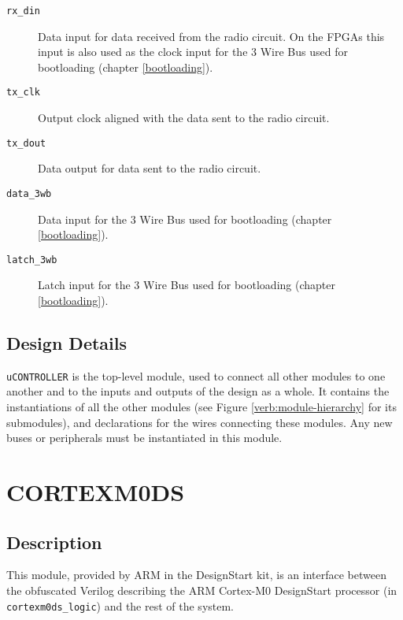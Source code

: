 \begin{description}
	\item[\texttt{rx\_din}] Data input for data received from the radio circuit. On the FPGAs this input is also used as the clock input for the 3 Wire Bus used for bootloading (chapter \ref{bootloading}).
	\item[\texttt{tx\_clk}] Output clock aligned with the data sent to the radio circuit.
	\item[\texttt{tx\_dout}] Data output for data sent to the radio circuit.
	\item[\texttt{data\_3wb}] Data input for the 3 Wire Bus used for bootloading (chapter \ref{bootloading}).
	\item[\texttt{latch\_3wb}] Latch input for the 3 Wire Bus used for bootloading (chapter \ref{bootloading}).
\end{description}

\subsection{Design Details}
\texttt{uCONTROLLER} is the top-level module, used to connect all other modules to one another and to the inputs and outputs of the design as a whole. It contains the instantiations of all the other modules (see Figure \ref{verb:module-hierarchy} for its submodules), and declarations for the wires connecting these modules. Any new buses or peripherals must be instantiated in this module.

\section{CORTEXM0DS}
\subsection{Description}
This module, provided by ARM in the DesignStart kit, is an interface between the obfuscated Verilog describing the ARM Cortex-M0 DesignStart processor (in \texttt{cortexm0ds\_logic}) and the rest of the system.


